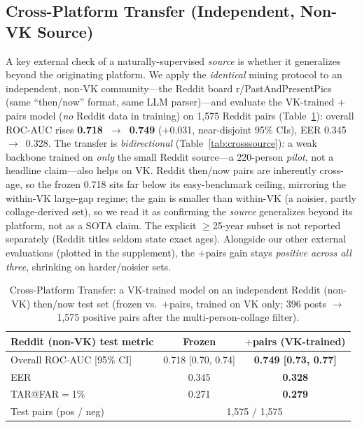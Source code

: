 \documentclass[journal]{IEEEtran}
\begin{document}
\subsection{Cross-Platform Transfer (Independent, Non-VK Source)}\label{sec:res-crossplatform}
A key external check of a naturally-supervised \emph{source} is whether it generalizes beyond the originating platform. We apply the \emph{identical} mining protocol to an independent, non-VK community---the Reddit board r/PastAndPresentPics (same ``then/now'' format, same LLM parser)---and evaluate the VK-trained $+$pairs model (\emph{no} Reddit data in training) on 1{,}575 Reddit pairs (Table~\ref{tab:crossplatform}): overall ROC-AUC rises \textbf{0.718~$\rightarrow$~0.749} ($+$0.031, near-disjoint 95\% CIs), EER 0.345~$\rightarrow$~0.328. The transfer is \emph{bidirectional} (Table~\ref{tab:crosssource}): a weak backbone trained on \emph{only} the small Reddit source---a 220-person \emph{pilot}, not a headline claim---also helps on VK. Reddit then/now pairs are inherently cross-age, so the frozen 0.718 sits far below its easy-benchmark ceiling, mirroring the within-VK large-gap regime; the gain is smaller than within-VK (a noisier, partly collage-derived set), so we read it as confirming the \emph{source} generalizes beyond its platform, not as a SOTA claim. The explicit $\geq$25-year subset is not reported separately (Reddit titles seldom state exact ages). Alongside our other external evaluations (plotted in the supplement), the $+$pairs gain stays \emph{positive across all three}, shrinking on harder/noisier sets.

\begin{table}[!t]
\renewcommand{\arraystretch}{1.2}
\caption{Cross-Platform Transfer: a VK-trained model on an independent Reddit (non-VK) then/now test set (frozen vs.\ $+$pairs, trained on VK only; 396 posts $\rightarrow$ 1{,}575 positive pairs after the multi-person-collage filter).}
\label{tab:crossplatform}
\centering
\footnotesize
\begin{tabular}{@{}lcc@{}}
\toprule
Reddit (non-VK) test metric & Frozen & $+$pairs (VK-trained) \\
\midrule
Overall ROC-AUC [95\% CI] & 0.718 [0.70, 0.74] & \textbf{0.749 [0.73, 0.77]} \\
EER & 0.345 & \textbf{0.328} \\
TAR@FAR$=$1\% & 0.271 & \textbf{0.279} \\
\midrule
Test pairs (pos / neg) & \multicolumn{2}{c}{1{,}575 / 1{,}575} \\
\bottomrule
\end{tabular}
\end{table}
\end{document}
